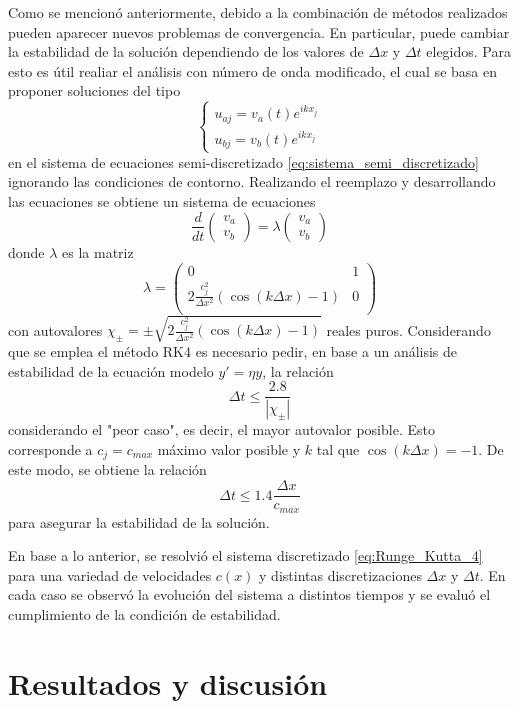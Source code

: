 \documentclass[aps,prb,twocolumn,superscriptaddress,floatfix,longbibliography,10pt]{revtex4-2}
\newcounter{para}
\begin{document}
Como se mencionó anteriormente, debido a la combinación de métodos realizados pueden aparecer nuevos problemas de convergencia. En particular, puede cambiar la estabilidad de la solución dependiendo de los valores de $\Delta x$ y $\Delta t$ elegidos. Para esto es útil realiar el análisis con número de onda modificado, el cual se basa en proponer soluciones del tipo
\[\left\{\begin{matrix}
  u_{a j} = v_a(t)e^{i k x_j}\\
  u_{b j} = v_b(t)e^{i k x_j} 
\end{matrix}\right.\]
en el sistema de ecuaciones semi-discretizado \ref{eq:sistema_semi_discretizado} ignorando las condiciones de contorno. Realizando el reemplazo y desarrollando las ecuaciones se obtiene un sistema de ecuaciones
\[
\frac{d}{dt} \begin{pmatrix}
 v_a \\ v_b
 \end{pmatrix}
 =  
 \lambda
 \begin{pmatrix}
 v_a \\ v_b
 \end{pmatrix}
\]
donde $\lambda$ es la matriz
\[\lambda = \begin{pmatrix}
  0 & 1 \\
  2 \frac{c_j^2}{\Delta x^2}(\cos{(k \Delta x)} - 1) & 0 \\
  \end{pmatrix}\]
con autovalores $\chi_{\pm} = \pm \sqrt{2 \frac{c_j^2}{\Delta x^2}(\cos{(k \Delta x)} - 1)}$ reales puros. Considerando que se emplea el método RK4 es necesario pedir, en base a un análisis de estabilidad de la ecuación modelo $y' = \eta y$, la relación
\[\Delta t \leq \frac{2.8}{ |\chi_{\pm}| }\]
considerando el "peor caso", es decir, el mayor autovalor posible. Esto corresponde a $c_j = c_{max}$ máximo valor posible y $k$ tal que $\cos{(k \Delta x)} = -1$. De este modo, se obtiene la relación
\begin{equation}
  \Delta t \leq 1.4 \frac{\Delta x}{c_{max}}
  \label{eq:condicion_estabilidad}
\end{equation}
para asegurar la estabilidad de la solución.


En base a lo anterior, se resolvió el sistema discretizado \ref{eq:Runge_Kutta_4} para una variedad de velocidades $c(x)$ y distintas discretizaciones $\Delta x$ y $\Delta t$. En cada caso se observó la evolución del sistema a distintos tiempos y se evaluó el cumplimiento de la condición de estabilidad.

\section{Resultados y discusión}
\end{document}
